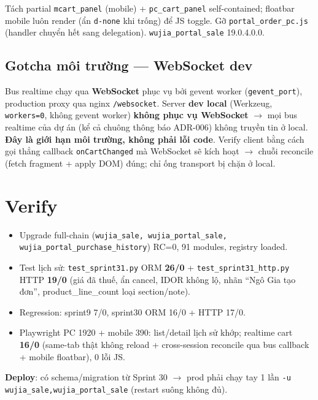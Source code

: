 Tách partial \texttt{mcart\_panel} (mobile) + \texttt{pc\_cart\_panel} self-contained; floatbar
mobile luôn render (ẩn \texttt{d-none} khi trống) để JS toggle. Gỡ \texttt{portal\_order\_pc.js}
(handler chuyển hết sang delegation). \texttt{wujia\_portal\_sale} 19.0.4.0.0.

\subsection{Gotcha môi trường --- WebSocket dev}

Bus realtime chạy qua \textbf{WebSocket} phục vụ bởi gevent worker (\texttt{gevent\_port}), production
proxy qua nginx \texttt{/websocket}. Server \textbf{dev local} (Werkzeug, \texttt{workers=0}, không
gevent worker) \textbf{không phục vụ WebSocket} $\rightarrow$ mọi bus realtime của dự án (kể cả
chuông thông báo ADR-006) không truyền tin ở local. \textbf{Đây là giới hạn môi trường, không phải
lỗi code}. Verify client bằng cách gọi thẳng callback \texttt{onCartChanged} mà WebSocket sẽ kích
hoạt $\rightarrow$ chuỗi reconcile (fetch fragment + apply DOM) đúng; chỉ ống transport bị chặn ở local.

\section{Verify}

\begin{itemize}
\item Upgrade full-chain (\texttt{wujia\_sale, wujia\_portal\_sale, wujia\_portal\_purchase\_history})
      RC=0, 91 modules, registry loaded.
\item Test lịch sử: \texttt{test\_sprint31.py} ORM \textbf{26/0} + \texttt{test\_sprint31\_http.py}
      HTTP \textbf{19/0} (giá đã thuế, ẩn cancel, IDOR không lộ, nhãn ``Ngô Gia tạo đơn'',
      product\_line\_count loại section/note).
\item Regression: sprint9 7/0, sprint30 ORM 16/0 + HTTP 17/0.
\item Playwright PC 1920 + mobile 390: list/detail lịch sử khớp; realtime cart \textbf{16/0}
      (same-tab thật không reload + cross-session reconcile qua bus callback + mobile floatbar),
      0 lỗi JS.
\end{itemize}

\textbf{Deploy}: có schema/migration từ Sprint 30 $\rightarrow$ prod phải chạy tay 1 lần
\texttt{-u wujia\_sale,wujia\_portal\_sale} (restart suông không đủ).
